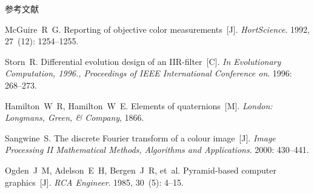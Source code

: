 \documentclass[xcolor=svgnames,serif,table,10pt]{beamer}
\begin{document}
\begin{frame}[allowframebreaks]{参考文献}
\begin{thebibliography}{10}
McGuire~R~G.
\newblock Reporting of objective color measurements~[J].
\newblock \emph{HortScience}.
1992, 27~(12):  1254--1255.

Storn~R.
\newblock Differential evolution design of an IIR-filter~[C].
\newblock \emph{In Evolutionary Computation, 1996., Proceedings of IEEE International
  Conference on}.
1996:  268--273.

{\beamertemplatebookbibitems
{}
Hamilton~W~R, Hamilton~W~E.
\newblock Elements of quaternions~[M].
\newblock \emph{London: Longmans, Green, \& Company}, 1866.}

Sangwine~S.
\newblock The discrete Fourier transform of a colour image~[J].
\newblock \emph{Image Processing II Mathematical Methods, Algorithms and Applications}.
2000:  430--441.

Ogden~J~M, Adelson~E~H, Bergen~J~R, et~al.
\newblock Pyramid-based computer graphics~[J].
\newblock \emph{RCA Engineer}.
1985, 30~(5):  4--15.
\end{thebibliography}
\end{frame}

\begin{frame}[plain]{}
  \begin{center}
  \end{center}
\end{frame}
\end{document}
